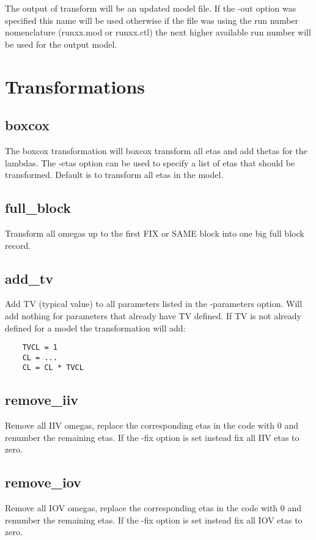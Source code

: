The output of transform will be an updated model file. If the -out option was specified this name will be used otherwise if the file was using the run number nomenclature (runxx.mod or runxx.ctl) the next higher available run number will be used for the output model.

\section{Transformations}

\subsection{boxcox}
The boxcox transformation will boxcox transform all etas and add thetas for the lambdas. The -etas option can be used to specify a list of etas that should be transformed. Default is to transform all etas in the model.

\subsection{full\_block}
Transform all omegas up to the first FIX or SAME block into one big full block record.

\subsection{add\_tv}
Add TV (typical value) to all parameters listed in the -parameters option. Will add nothing for parameters that already have TV defined. If TV is not already defined for a model the transformation will add:
\begin{verbatim}
    TVCL = 1
    CL = ...
    CL = CL * TVCL
\end{verbatim}

\subsection{remove\_iiv}
Remove all IIV omegas, replace the corresponding etas in the code with 0 and renumber the remaining etas. If the -fix option is set instead fix all IIV etas to zero.

\subsection{remove\_iov}
Remove all IOV omegas, replace the corresponding etas in the code with 0 and renumber the remaining etas. If the -fix option is set instead fix all IOV etas to zero.


